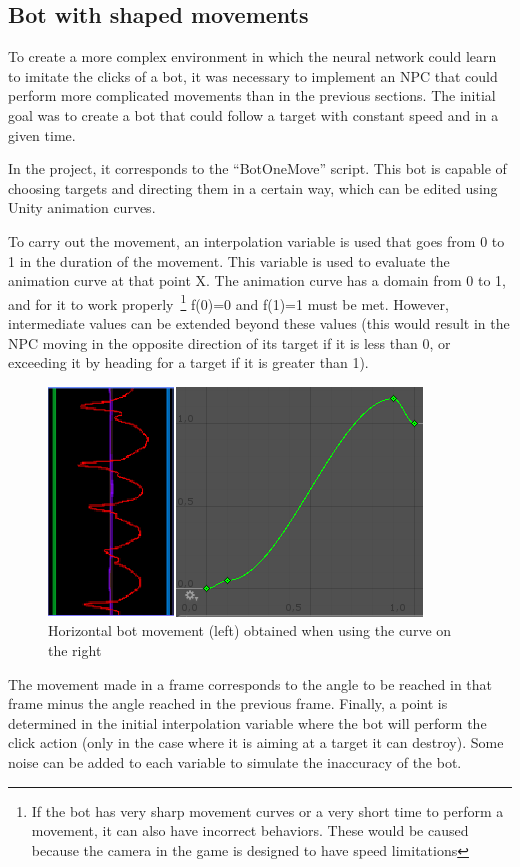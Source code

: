 \subsection{Bot with shaped movements} %
\label{sec:botshaped}

To create a more complex environment in which the neural network could learn to imitate the clicks of a bot, it was necessary to implement an NPC that could perform more complicated movements than in the previous sections. The initial goal was to create a bot that could follow a target with constant speed and in a given time.

In the project, it corresponds to the ``BotOneMove'' script. This bot is capable of choosing targets and directing them in a certain way, which can be edited using Unity animation curves.

To carry out the movement, an interpolation variable is used that goes from 0 to 1 in the duration of the movement. This variable is used to evaluate the animation curve at that point X. The animation curve has a domain from 0 to 1, and for it to work properly~\footnote{If the bot has very sharp movement curves or a very short time to perform a movement, it can also have incorrect behaviors. These would be caused because the camera in the game is designed to have speed limitations} f(0)=0 and f(1)=1 must be met. However, intermediate values can be extended beyond these values (this would result in the NPC moving in the opposite direction of its target if it is less than 0, or exceeding it by heading for a target if it is greater than 1).

\begin{figure}[h]
  \centering
		\includegraphics[width=.6\textwidth]{img/botMoveCurve.png}
  \caption{Horizontal bot movement (left) obtained when using the curve on the right}
  \label{fig:onemoveCurve}
\end{figure}


The movement made in a frame corresponds to the angle to be reached in that frame minus the angle reached in the previous frame. Finally, a point is determined in the initial interpolation variable where the bot will perform the click action (only in the case where it is aiming at a target it can destroy). Some noise can be added to each variable to simulate the inaccuracy of the bot.

